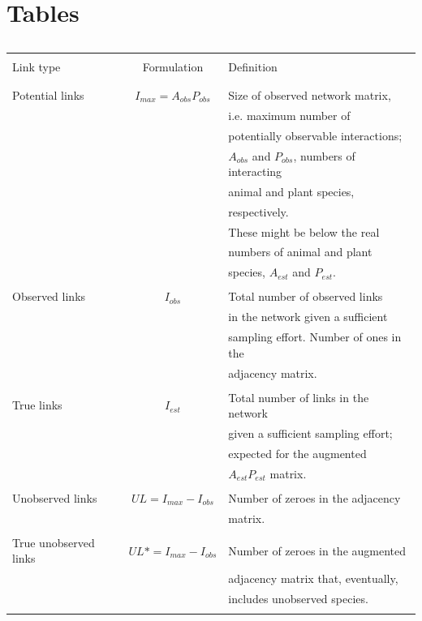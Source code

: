 \documentclass[12pt]{article}
\begin{document}
\section*{Tables}
\begin{table}[ht!]
     \renewcommand{\arraystretch}{0.8}
  \caption{}
  \label{Table_1}
  \begin{center}
		\begin{tabular}{lcl}
      \hline
\\Link type   &  Formulation   &   Definition\\\\
      \hline
\\Potential links&$I_{max}= A_{obs}P_{obs}$&Size of observed network matrix,  \\ && i.e. maximum number of \\ && potentially observable interactions;  \\ && $A_{obs}$ and $P_{obs}$, numbers of interacting  \\ && animal and plant species, \\ &&  respectively. \\&& These might be below the real  \\ && numbers of animal and plant \\ &&  species, $A_{est}$ and $P_{est}$.\\\\
Observed links&$I_{obs}$&Total number of observed links  \\ && in the network given a sufficient \\ &&  sampling effort. Number of ones in the  \\ && adjacency matrix.\\\\
True links&$I_{est}$&Total number of links in the network \\ &&  given a sufficient sampling effort;  \\ && expected for the augmented \\ &&  $A_{est}P_{est}$ matrix. \\\\
Unobserved links&$UL= I_{max} - I_{obs}$&Number of zeroes in the  adjacency \\ && matrix.\\\\
True unobserved links&$UL*= I_{max} - I_{obs}$&Number of zeroes in the augmented \\ &&  adjacency matrix that, eventually,  \\ &&  includes unobserved species.\\\\

\end{tabular}
\end{center}
\end{table}
\end{document}
